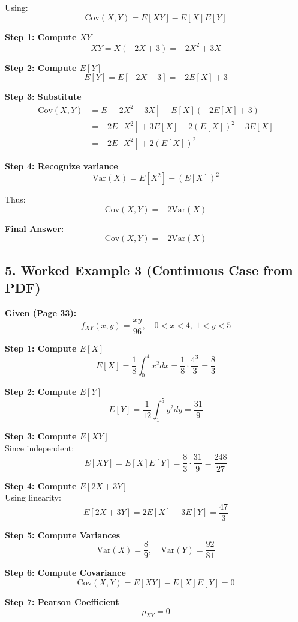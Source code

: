 \documentclass[11pt]{article}
\begin{document}
\noindent Using:
\[
\text{Cov}(X,Y)=E[XY]-E[X]E[Y]
\]

\noindent \textbf{Step 1: Compute $XY$}
\[
XY = X(-2X+3)= -2X^2 + 3X
\]

\noindent \textbf{Step 2: Compute $E[Y]$}
\[
E[Y]=E[-2X+3]=-2E[X]+3
\]

\noindent \textbf{Step 3: Substitute}
\begin{align*}
\text{Cov}(X,Y) &= E[-2X^2+3X] - E[X](-2E[X]+3) \\
&= -2E[X^2] + 3E[X] + 2(E[X])^2 -3E[X] \\
&= -2E[X^2] + 2(E[X])^2
\end{align*}

\noindent \textbf{Step 4: Recognize variance}
\[
\text{Var}(X)=E[X^2]-(E[X])^2
\]

\noindent Thus:
\[
\text{Cov}(X,Y) = -2\text{Var}(X)
\]

\noindent \textbf{Final Answer:}
\[
\boxed{\text{Cov}(X,Y) = -2\text{Var}(X)}
\]

\newpage

\subsection*{5. Worked Example 3 (Continuous Case from PDF)}

\noindent\textbf{Given (Page 33):}
\[
f_{XY}(x,y)=\frac{xy}{96}, \quad 0<x<4,\;1<y<5
\]

\noindent \textbf{Step 1: Compute $E[X]$}
\[
E[X]=\frac{1}{8}\int_0^4 x^2 dx = \frac{1}{8}\cdot \frac{4^3}{3} = \frac{8}{3}
\]

\noindent \textbf{Step 2: Compute $E[Y]$}
\[
E[Y]=\frac{1}{12}\int_1^5 y^2 dy = \frac{31}{9}
\]

\noindent \textbf{Step 3: Compute $E[XY]$}\\
Since independent:
\[
E[XY]=E[X]E[Y]=\frac{8}{3}\cdot \frac{31}{9}=\frac{248}{27}
\]

\noindent \textbf{Step 4: Compute $E[2X+3Y]$}\\
Using linearity:
\[
E[2X+3Y] = 2E[X]+3E[Y]=\frac{47}{3}
\]

\noindent \textbf{Step 5: Compute Variances}
\[
\text{Var}(X)=\frac{8}{9}, \quad \text{Var}(Y)=\frac{92}{81}
\]

\noindent \textbf{Step 6: Compute Covariance}
\[
\text{Cov}(X,Y)=E[XY]-E[X]E[Y]=0
\]

\noindent \textbf{Step 7: Pearson Coefficient}
\[
\rho_{XY}=0
\]

\newpage
\end{document}
